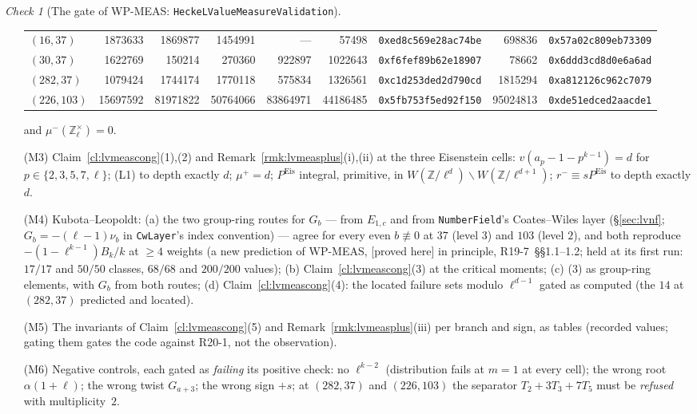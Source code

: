\documentclass[11pt]{article}
\theoremstyle{remark}
\newtheorem{checkitem}[theorem]{Check}
\newcommand{\Z}{\mathbb{Z}}
\newcommand{\PROVED}{\textsf{[proved here]}}
\begin{document}
\begin{checkitem}[The gate of WP-MEAS: \texttt{HeckeLValueMeasureValidation}]
\begin{enumerate}
\begin{center}
\begin{tabular}{@{}lrrrrrlrl@{}}
  $(16,37)$ & 1873633 & 1869877 & 1454991 & --- & 57498 & \texttt{0xed8c569e28ac74be} & 698836 & \texttt{0x57a02c809eb73309}\\
  $(30,37)$ & 1622769 & 150214 & 270360 & 922897 & 1022643 & \texttt{0xf6fef89b62e18907} & 78662 & \texttt{0x6ddd3cd8d0e6a6ad}\\
  $(282,37)$ & 1079424 & 1744174 & 1770118 & 575834 & 1326561 & \texttt{0xc1d253ded2d790cd} & 1815294 & \texttt{0xa812126c962c7079}\\
  $(226,103)$ & 15697592 & 81971822 & 50764066 & 83864971 & 44186485 & \texttt{0x5fb753f5ed92f150} & 95024813 & \texttt{0xde51edced2aacde1}\\
  \bottomrule
  \end{tabular}
  \end{center}
  and $\mu^{-}(\Z_\ell^{\times})=0$.
\item[(M3)] Claim~\ref{cl:lvmeascong}(1),(2) and Remark~\ref{rmk:lvmeasplus}(i),(ii) at the three Eisenstein cells: $v(a_p-1-p^{k-1})=d$ for $p\in\{2,3,5,7,\ell\}$; (L1) to depth exactly $d$;
  $\mu^{+}=d$; $P^{\mathrm{Eis}}$ integral, primitive, in $W(\Z/\ell^{d})\smallsetminus W(\Z/\ell^{d+1})$; $r^{-}\equiv sP^{\mathrm{Eis}}$ to depth exactly $d$.
\item[(M4)] Kubota--Leopoldt: (a) the two group-ring routes for $G_b$ --- from $E_{1,c}$ and from \texttt{NumberField}'s Coates--Wiles layer (\S\ref{sec:lvnf}; $G_b=-(\ell-1)\nu_b$ in
  \texttt{CwLayer}'s index convention) --- agree for every even $b\not\equiv0$ at $37$ (level $3$) and $103$ (level $2$), and both reproduce $-(1-\ell^{k-1})B_k/k$ at $\ge4$ weights (a
  new prediction of WP-MEAS, \PROVED{} in principle, R19-7~\S\S1.1--1.2; held at its first run: $17/17$ and $50/50$ classes, $68/68$ and $200/200$ values); (b) Claim~\ref{cl:lvmeascong}(3) at the critical moments; (c) (3) as group-ring
  elements, with $G_b$ from both routes; (d) Claim~\ref{cl:lvmeascong}(4): the located failure sets modulo $\ell^{d-1}$ gated as computed (the $14$ at $(282,37)$ predicted and located).
\item[(M5)] The invariants of Claim~\ref{cl:lvmeascong}(5) and Remark~\ref{rmk:lvmeasplus}(iii) per branch and sign, as tables (recorded values; gating them gates the code against R20-1, not
  the observation).
\item[(M6)] Negative controls, each gated as \emph{failing} its positive check: no $\ell^{k-2}$ (distribution fails at $m=1$ at every cell); the wrong root $\alpha(1+\ell)$; the wrong twist
  $G_{a+3}$; the wrong sign $+s$; at $(282,37)$ and $(226,103)$ the separator $T_2+3T_3+7T_5$ must be \emph{refused} with multiplicity~$2$.

\end{enumerate}
\end{checkitem}
\end{document}
